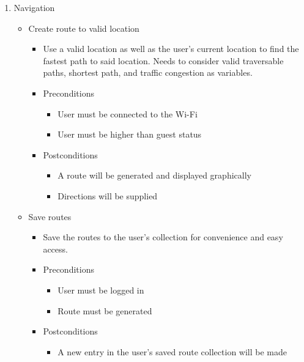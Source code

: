 \documentclass[12pt]{article}
\begin{document}
		\begin{enumerate}
		  	\item Navigation	
		  	
			\begin{itemize}
			
				\item Create route to valid location
				\begin{itemize}
					\item Use a valid location as well as the user’s current location to find the fastest path to said location. Needs to consider valid traversable paths, shortest path, and traffic congestion as variables.
					\item Preconditions
					\begin{itemize}
						\item User must be connected to the Wi-Fi
						\item User must be higher than guest status
					\end{itemize}
					\item Postconditions
					\begin{itemize}
						\item A route will be generated and displayed graphically 
						\item Directions will be supplied
					\end{itemize}
				\end{itemize}
				
				\item Save routes
				\begin{itemize}
					\item Save the routes to the user’s collection for convenience and easy access.
					\item Preconditions
					\begin{itemize}
						\item User must be logged in
						\item Route must be generated
					\end{itemize}
					\item Postconditions
					\begin{itemize}
						\item A new entry in the user’s saved route collection will be made
					\end{itemize}
				\end{itemize}
				

\end{itemize}
\end{enumerate}
\end{document}

